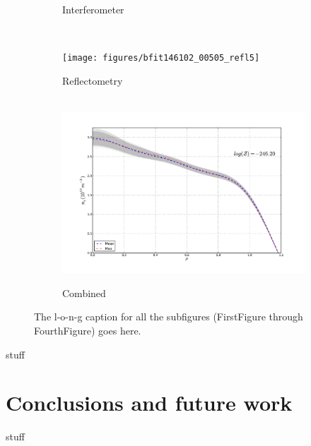 \documentclass[12pt]{article}
\numberwithin{equation}{section}
\begin{document}
\begin{figure}[ht]
\begin{subfigure}[b]{0.5\textwidth}
		\vspace{-30pt}
		\caption{Interferometer}
		\label{fig:inter505}
	\end{subfigure} \\%
	\begin{subfigure}[b]{0.5\textwidth}
		\centering
		\texttt{[image: figures/bfit146102\_00505\_refl5]}
		\vspace{-30pt}
		\caption{Reflectometry}
		\label{fig:refl505}
	\end{subfigure}
	\hspace{-20pt}
	\begin{subfigure}[b]{0.5\textwidth}
		\centering‪
		\includegraphics[width=\textwidth,keepaspectratio=true]{figures/bfit146102_00505_all5}
		\vspace{-30pt}
		\caption{Combined}
		\label{fig:all505}
	\end{subfigure}
	\caption{The l-o-n-g caption for all the subfigures (FirstFigure through FourthFigure) goes here.}
	\label{fig:dne505}
\end{figure}
stuff

\section{Conclusions and future work}
stuff
\newpage


\end{document}
